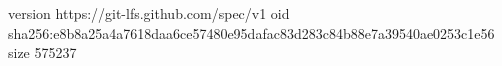 version https://git-lfs.github.com/spec/v1
oid sha256:e8b8a25a4a7618daa6ce57480e95dafac83d283c84b88e7a39540ae0253c1e56
size 575237
